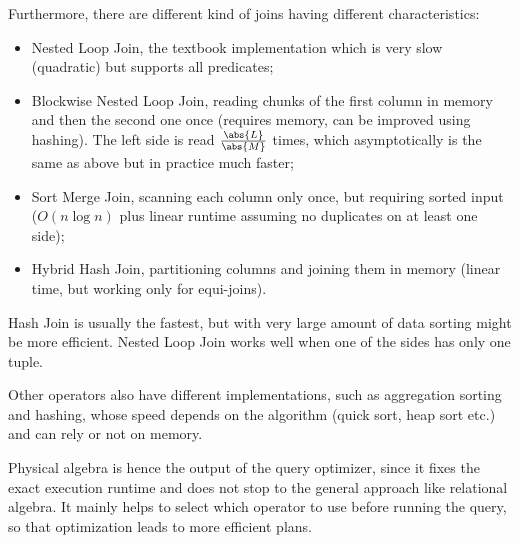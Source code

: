 Furthermore, there are different kind of joins having different characteristics:
\begin{itemize}
	\item Nested Loop Join, the textbook implementation which is very slow (quadratic) but supports all predicates;
	\item Blockwise Nested Loop Join, reading chunks of the first column in memory and then the second one once (requires memory, can be improved using hashing). The left side is read $\frac{\abs{L}}{\abs{M}}$ times, which asymptotically is the same as above but in practice much faster;
	\item Sort Merge Join, scanning each column only once, but requiring sorted input ($O(n\log n)$ plus linear runtime assuming no duplicates on at least one side);
	\item Hybrid Hash Join, partitioning columns and joining them in memory (linear time, but working only for equi-joins).
\end{itemize}

Hash Join is usually the fastest, but with very large amount of data sorting might be more efficient. Nested Loop Join works well when one of the sides has only one tuple.

Other operators also have different implementations, such as aggregation sorting and hashing, whose speed depends on the algorithm (quick sort, heap sort etc.) and can rely or not on memory.

Physical algebra is hence the output of the query optimizer, since it fixes the exact execution runtime and does not stop to the general approach like relational algebra. It mainly helps to select which operator to use before running the query, so that optimization leads to more efficient plans.

